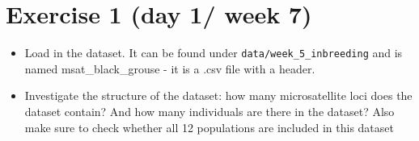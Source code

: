 \documentclass[
  letterpaper,
  DIV=11,
  numbers=noendperiod]{scrreprt}
\providecommand{\tightlist}{%
  \setlength{\itemsep}{0pt}\setlength{\parskip}{0pt}}\usepackage{longtable,booktabs,array}
\begin{document}
\section{Exercise 1 (day 1/ week 7)}\label{exercise-1-day-1-week-7}

\begin{itemize}
\tightlist
\item
  Load in the dataset. It can be found under
  \texttt{data/week\_5\_inbreeding} and is named msat\_black\_grouse -
  it is a .csv file with a header.
\item
  Investigate the structure of the dataset: how many microsatellite loci
  does the dataset contain? And how many individuals are there in the
  dataset? Also make sure to check whether all 12 populations are
  included in this dataset
\end{itemize}
\end{document}
